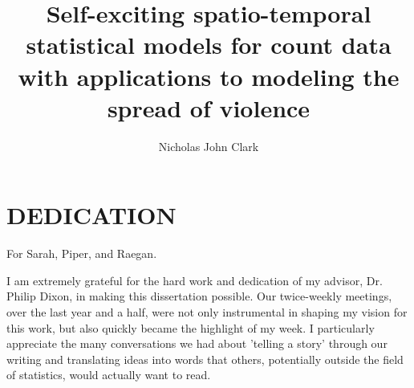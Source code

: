 \documentclass[11pt]{isuthesis}
\begin{document}
\title{Self-exciting spatio-temporal statistical models for count data with applications to modeling the spread of violence}
\author{Nicholas John Clark}
\notice
\maketitle

\chapter*{DEDICATION}
For Sarah, Piper, and Raegan.  

\tableofcontents
{} \cleardoublepage {}
{}
\listoftables
\cleardoublepage {} {}
\listoffigures
\cleardoublepage {}
{}
I am extremely grateful for the hard work and dedication of my advisor, Dr. Philip Dixon, in making this dissertation possible.  Our twice-weekly meetings, over the last year and a half, were not only instrumental in shaping my vision for this work, but also quickly became the highlight of my week.  I particularly appreciate the many conversations we had about 'telling a story' through our writing and translating ideas into words that others, potentially outside the field of statistics, would actually want to read.
\end{document}
